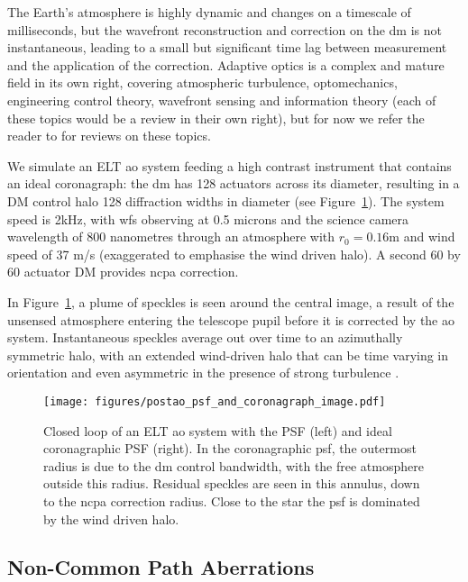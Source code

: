 \documentclass[letterpaper]{ar-1col}
\begin{document}
The Earth's atmosphere is highly dynamic and changes on a timescale of milliseconds, but the wavefront reconstruction and correction on the \ac{dm} is not instantaneous, leading to a small but significant time lag between measurement and the application of the correction.
%
Adaptive optics is a complex and mature field in its own right, covering atmospheric turbulence, optomechanics, engineering control theory, wavefront sensing and information theory (each of these topics would be a review in their own right), but for now we refer the reader to \citet{Guyon18} for reviews on these topics. 

We simulate an ELT \ac{ao} system feeding a high contrast instrument that contains an ideal coronagraph: the \ac{dm} has 128 actuators across its diameter, resulting in a DM control halo 128 diffraction widths in diameter (see Figure~\ref{fig:aopsf}). 
%
The system speed is 2kHz, with \ac{wfs} observing at 0.5 microns and the science camera wavelength of 800 nanometres through an atmosphere with $r_0=0.16$m and wind speed of 37 m/s (exaggerated to emphasise the wind driven halo).
%
A second 60 by 60 actuator DM provides \ac{ncpa} correction.

In Figure~\ref{fig:aopsf}, a plume of speckles is seen around the central image, a result of the unsensed atmosphere entering the telescope pupil before it is corrected by the \ac{ao} system. 
%
Instantaneous speckles average out over time to an azimuthally symmetric halo, with an extended wind-driven halo that can be time varying in orientation and even asymmetric in the presence of strong turbulence \citep{Cantalloube18}.


\begin{figure}[ht]
  \centering
  \texttt{[image: figures/postao\_psf\_and\_coronagraph\_image.pdf]}
  \caption{Closed loop of an ELT \ac{ao} system with the PSF (left) and ideal coronagraphic PSF (right).
  In the coronagraphic \ac{psf}, the outermost radius is due to the \ac{dm} control bandwidth, with the free atmosphere outside this radius.
  Residual speckles are seen in this annulus, down to the \ac{ncpa} correction radius.
  Close to the star the \ac{psf} is dominated by the wind driven halo.
  }
  \label{fig:aopsf}
\end{figure}

\subsection{Non-Common Path Aberrations}
\end{document}
